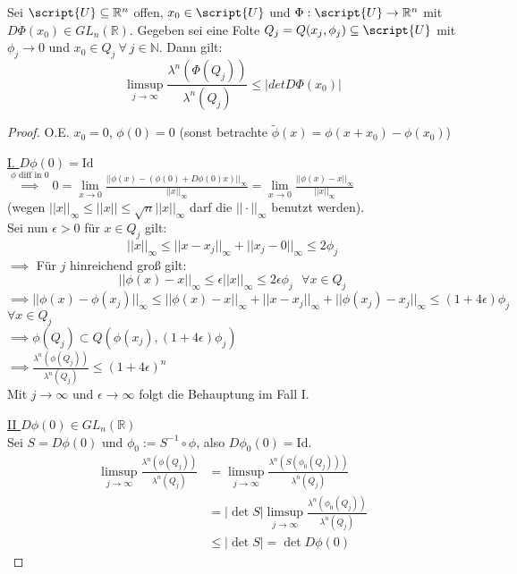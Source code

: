   \begin{lemma}
    Sei $\script{U} \subseteq \mathbb{R}^n$ offen, $x_0 \in \script{U}$ und $\Phi: \script{U} \to \mathbb{R}^n$ mit $D\Phi(x_0) \in GL_n(\mathbb{R})$. Gegeben sei eine Folte $Q_j = Q(x_j, \phi_j)\subseteq \script{U}$ mit $\phi_j \to 0$ und $x_0 \in Q_j \ \forall \ j \in \mathbb{N}$. Dann gilt:
    $$\limsup\limits_{j \to \infty} \frac{\lambda^n(\Phi(Q_j))}{\lambda^n(Q_j)} \leq |det D\Phi(x_0)|$$
  \end{lemma}
  \begin{proof}
    O.E. $x_0 = 0$, $\phi(0) = 0$ (sonst betrachte $\tilde{\phi}(x) = \phi(x+x_0) - \phi (x_0)$)
    \item[]\underline{I. $D\phi (0) = \text{Id}$} \\
    $\overset{\phi \text{ diff in } 0}{\implies} 0 = \lim\limits_{x\to 0} \frac{||\phi(x) - (\phi (0) + D\phi (0) x) ||_\infty}{||x||_\infty} = \lim\limits_{x\to 0} \frac{|| \phi(x) - x ||_\infty}{||x||_\infty}$ \\
    (wegen $||x||_\infty \leq ||x|| \leq \sqrt{n} ||x||_\infty$ darf die $|| \cdot ||_\infty$ benutzt werden). \\
    Sei nun $\epsilon > 0$ für $x\in Q_j$ gilt: 
    $$ ||x||_\infty \leq ||x-x_j||_\infty + ||x_j-0||_\infty \leq 2 \phi_j$$ 
    $\implies$ Für $j$ hinreichend groß gilt: \\
    $$||\phi (x) - x ||_\infty \leq \epsilon ||x||_\infty \leq 2\epsilon \phi_j \text{   } \forall x\in Q_j$$
    $\implies ||\phi(x) - \phi(x_j)||_\infty \leq ||\phi(x) - x||_\infty + ||x-x_j||_\infty + ||\phi(x_j) - x_j||_\infty \leq (1+4\epsilon)\phi_j$ $\forall x\in Q_j$ \\
    $\implies \phi (Q_j) \subset Q(\phi(x_j), (1+4\epsilon)\phi_j)$ \\
    $\implies \frac{\lambda^n(\phi(Q_j))}{\lambda^n (Q_j)} \leq (1+4\epsilon)^n$ \\
    Mit $j\to\infty$ und $\epsilon\to\infty$ folgt die Behauptung im Fall I. 
    \item[] \underline{II $D\phi(0) \in GL_n(\mathbb{R})$} \\
    Sei $S = D\phi(0)$ und $\phi_0 := S^{-1} \circ \phi$, also $D\phi_0(0) = \text{Id}$.
    \begin{align*}
    \limsup\limits_{j\to\infty} \frac{\lambda^n(\phi(Q_j))}{\lambda^n(Q_j)} &= \limsup\limits_{j\to\infty} \frac{\lambda^n(S(\phi_0(Q_j)))}{\lambda^n(Q_j)} \\
    &= |\det{S}| \limsup\limits_{j\to\infty} \frac{\lambda^n(\phi_0(Q_j))}{\lambda^n(Q_j)} \\
    &\leq |\det{S}| = \det{D\phi(0)}
    \end{align*}
  \end{proof}
